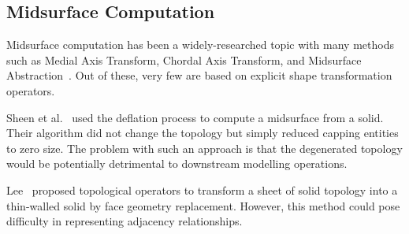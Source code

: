 \documentclass[11pt,a4paper]{article}
\begin{document}

\subsection{Midsurface Computation}

Midsurface computation has been a widely-researched topic with many methods
such as Medial Axis Transform, Chordal Axis Transform, and Midsurface
Abstraction~\cite{Thakur2009}. Out of these, very few are based on explicit
shape transformation operators.

Sheen et al.~\cite{Sheen2008} used the deflation process to compute a
midsurface from a solid. Their algorithm did not change the topology but
simply reduced capping entities to zero size. The problem with such an
approach is that the degenerated topology would be potentially detrimental
to downstream modelling operations.

Lee~\cite{Lee2009a} proposed topological operators to transform a sheet of
solid topology into a thin-walled solid by face geometry replacement.
However, this method could pose difficulty in representing adjacency
relationships.

%
\end{document}
